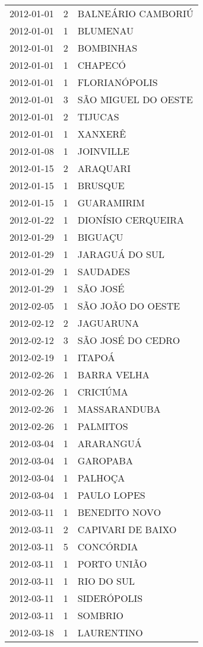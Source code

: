 \documentclass[
	12pt,				%
	openright,			%
	oneside,			%
	a4paper,			%
	english,			%
	french,				%
	spanish,			%
	brazil				%
	dvipsnames, table]{abntex2}
\begin{document}
\begin{longtable}[htbp]{ccl}
2012-01-01 & 2 & BALNEÁRIO CAMBORIÚ \\
2012-01-01 & 1 & BLUMENAU \\
2012-01-01 & 2 & BOMBINHAS \\
2012-01-01 & 1 & CHAPECÓ \\
2012-01-01 & 1 & FLORIANÓPOLIS \\
2012-01-01 & 3 & SÃO MIGUEL DO OESTE \\
2012-01-01 & 2 & TIJUCAS \\
2012-01-01 & 1 & XANXERÊ \\
2012-01-08 & 1 & JOINVILLE \\
2012-01-15 & 2 & ARAQUARI \\
2012-01-15 & 1 & BRUSQUE \\
2012-01-15 & 1 & GUARAMIRIM \\
2012-01-22 & 1 & DIONÍSIO CERQUEIRA \\
2012-01-29 & 1 & BIGUAÇU \\
2012-01-29 & 1 & JARAGUÁ DO SUL \\
2012-01-29 & 1 & SAUDADES \\
2012-01-29 & 1 & SÃO JOSÉ \\
2012-02-05 & 1 & SÃO JOÃO DO OESTE \\
2012-02-12 & 2 & JAGUARUNA \\
2012-02-12 & 3 & SÃO JOSÉ DO CEDRO \\
2012-02-19 & 1 & ITAPOÁ \\
2012-02-26 & 1 & BARRA VELHA \\
2012-02-26 & 1 & CRICIÚMA \\
2012-02-26 & 1 & MASSARANDUBA \\
2012-02-26 & 1 & PALMITOS \\
2012-03-04 & 1 & ARARANGUÁ \\
2012-03-04 & 1 & GAROPABA \\
2012-03-04 & 1 & PALHOÇA \\
2012-03-04 & 1 & PAULO LOPES \\
2012-03-11 & 1 & BENEDITO NOVO \\
2012-03-11 & 2 & CAPIVARI DE BAIXO \\
2012-03-11 & 5 & CONCÓRDIA \\
2012-03-11 & 1 & PORTO UNIÃO \\
2012-03-11 & 1 & RIO DO SUL \\
2012-03-11 & 1 & SIDERÓPOLIS \\
2012-03-11 & 1 & SOMBRIO \\
2012-03-18 & 1 & LAURENTINO \\

\end{longtable}
\end{document}
